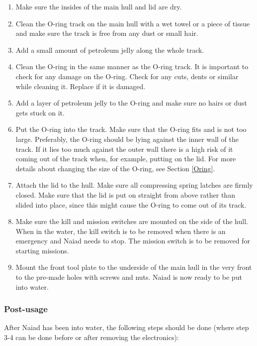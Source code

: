 \begin{enumerate}
  \item Make sure the insides of the main hull and lid are dry.
  \item Clean the O-ring track on the main hull with a wet towel or a piece of tissue and make sure the track is free from any dust or small hair. 
  \item Add a small amount of petroleum jelly along the whole track. 
  \item Clean the O-ring in the same manner as the O-ring track. It is important to check for any damage on the O-ring. Check for any cuts, dents or similar while cleaning it. Replace if it is damaged.
  \item Add a layer of petroleum jelly to the O-ring and make sure no hairs or dust gets stuck on it.
  
  \item Put the O-ring into the track. Make sure that the O-ring fits and is not too large. Preferably, the O-ring should be lying against the inner wall of the track. If it lies too much against the outer wall there is a high risk of it coming out of the track when, for example, putting on the lid. For more details about changing the size of the O-ring, see Section \ref{Oring}. 
\item	Attach the lid to the hull. Make sure all compressing spring latches are firmly closed. Make sure that the lid is put on straight from above rather than slided into place, since this might cause the O-ring to come out of its track.  
\item Make sure the kill and mission switches are mounted on the side of the hull. When in the water, the kill switch is to be removed when there is an emergency and Naiad needs to stop. The mission switch is to be removed for starting missions. 
\item Mount the front tool plate to the underside of the main hull in the very front to the pre-made holes with screws and nuts. Naiad is now ready to be put into water.
\end{enumerate}

	\subsubsection{Post-usage}
	\noindent After Naiad has been into water, the following steps should be done (where step 3-4 can be done before or after removing the electronics):
	
